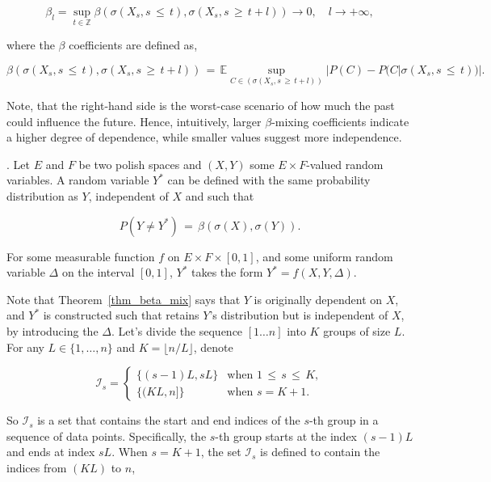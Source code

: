 \documentclass[twoside,11pt]{article}
\begin{document}
\[
\beta_l = \sup_{t \in \mathbb{Z}} \beta (\sigma (X_s, s \,\leq\, t), \sigma (X_s, s \,\geq\, t + l)) \rightarrow 0, \quad l \rightarrow +\infty,
\]

where the \(\beta\) coefficients are defined as,

\[
\beta(\sigma(X_s, s \,\leq\, t), \sigma(X_s, s \,\geq\, t + l)) \,=\, \mathbb{E} \sup_{C \in (\sigma(X_s, s\,\geq\, t+l))} |P(C) - P(C | \sigma(X_s, s \,\leq\, t))|.
\]

Note, that the right-hand side is the worst-case scenario of how much the past could influence the future. Hence, intuitively, larger $\beta$-mixing coefficients indicate a higher degree of dependence, while smaller values suggest more independence.


\begin{theorem}.
\label{thm_beta_mix}Let \(E\) and \(F\) be two polish spaces and \((X, Y)\) some \(E \times F\)-valued random variables. A random variable \(Y^*\) can be defined with the same probability distribution as \(Y\), independent of \(X\) and such that

\[
P(Y \neq Y^*) \,=\, \beta(\sigma(X), \sigma(Y)).
\]

For some measurable function \(f\) on \(E \times F \times [0,1]\), and some uniform random variable \(\Delta\) on the interval \([0,1]\), \(Y^*\) takes the form \(Y^* = f(X, Y, \Delta)\).    
\end{theorem}

Note that Theorem~\ref{thm_beta_mix} says that \(Y\) is originally dependent on \(X\), and \(Y^*\) is constructed such that retains \(Y\)'s distribution but is independent of \(X\), by introducing the \(\Delta\). 
Let's divide the sequence $[1\dots n]$ into $K$ groups of size $L$. For any \(L \in \{1, \ldots, n\}\) and \(K = \lfloor n/L \rfloor\), denote

\[
\mathcal{I}_s = 
\begin{cases}
\{ (s - 1)L, sL \} & \text{when } 1 \,\leq\, s \,\leq\, K, \\
\{ (KL, n] \} & \text{when } s = K + 1.
\end{cases}
\]

So $\mathcal{I}_s$ is a set that contains the start and end indices of the 
$s$-th group in a sequence of data points. Specifically, the 
$s$-th group starts at the index 
$(s-1)L$ and ends at index 
$sL$. When \(s = K + 1\), the set \(\mathcal{I}_s\) is defined to contain the indices from \((KL)\) to \(n\),
\end{document}
